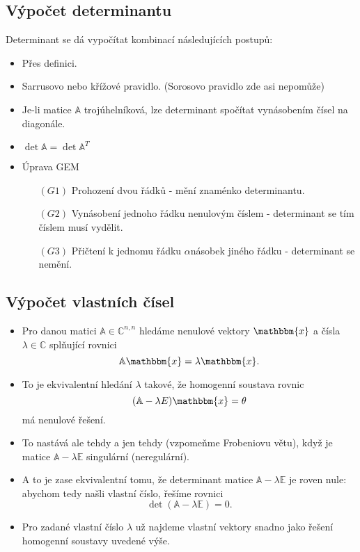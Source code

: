 \documentclass{szzclass}
\begin{document}
\subsection{Výpočet determinantu}
Determinant se dá vypočítat kombinací následujících postupů:
\begin{itemize}
\item Přes definici.
\item Sarrusovo nebo křížové pravidlo. (Sorosovo pravidlo zde asi nepomůže)
\item Je-li matice $\mathbb{A}$ trojúhelníková, lze determinant spočítat vynásobením čísel na diagonále.
\item $\det{\mathbb{A}}=\det{\mathbb{A}^T}$
\item Úprava GEM
  \begin{itemize}
  \item[$(G1)$] Prohození dvou řádků - mění znaménko determinantu.
  \item[$(G2)$] Vynásobení jednoho řádku nenulovým číslem - determinant se tím číslem musí vydělit.
  \item[$(G3)$] Přičtení k jednomu řádku $\alpha$násobek jiného řádku - determinant se nemění.
  \end{itemize}
\end{itemize}

\subsection{Výpočet vlastních čísel}

\begin{itemize}
\item Pro danou matici $\mathbb{A} \in \mathbb{C}^{n,n}$ hledáme nenulové vektory $\mathbbm{x}$ a čísla $\lambda\in\mathbb{C}$ splňující rovnici
\[
  \mathbb{A}\mathbbm{x} = \lambda \mathbbm{x}.
\]
\item To je ekvivalentní hledání $\lambda$ takové, že homogenní soustava rovnic
\[
  (\mathbb{A} - \lambda E)\mathbbm{x} = \theta
\]
má nenulové řešení.
\item To nastává ale tehdy a jen tehdy (vzpomeňme Frobeniovu větu), když je matice $\mathbb{A} - \lambda \mathbb{E}$ singulární (neregulární).
\item A to je zase ekvivalentní tomu, že determinant matice $\mathbb{A} - \lambda \mathbb{E}$ je roven nule: abychom tedy našli vlastní číslo, řešíme rovnici
\[
  \det(\mathbb{A} - \lambda \mathbb{E}) = 0.
\]
\item Pro zadané vlastní číslo $\lambda$ už najdeme vlastní vektory snadno jako řešení homogenní soustavy uvedené výše.
\end{itemize}
\end{document}
